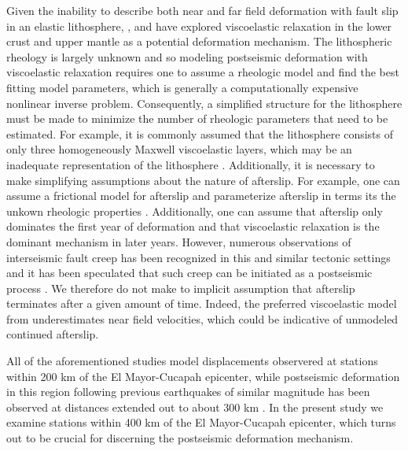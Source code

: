 \documentclass[12pt]{article}
\begin{document}
Given the inability to describe both near and far field deformation with fault slip in an elastic lithosphere, \citet{Pollitz2012}, \citet{Rollins2015} and \citet{Spinler2015} have explored viscoelastic relaxation in the lower crust and upper mantle as a potential deformation mechanism. The lithospheric rheology is largely unknown and so modeling postseismic deformation with viscoelastic relaxation requires one to assume a rheologic model and find the best fitting model parameters, which is generally a computationally expensive nonlinear inverse problem. Consequently, a simplified structure for the lithosphere must be made to minimize the number of rheologic parameters that need to be estimated.  For example, it is commonly assumed that the lithosphere consists of only three homogeneously Maxwell viscoelastic layers, which may be an inadequate representation of the lithosphere \citep[e.g.][]{Hines2013,Riva2009}. Additionally, it is necessary to make simplifying assumptions about the nature of afterslip. For example, one can assume a frictional model for afterslip and parameterize afterslip in terms its the unkown rheologic properties \citep[e.g.][]{Johnson2009,Johnson2004}. Additionally, one can assume that afterslip only dominates the first year of deformation \citep[e.g.][]{Pollitz2012,Spinler2015} and that viscoelastic relaxation is the dominant mechanism in later years. However, numerous observations of interseismic fault creep has been recognized in this and similar tectonic settings and it has been speculated that such creep can be initiated as a postseismic process \citep{Cakir2012,Cetin2014}.  We therefore do not make to implicit assumption that afterslip terminates after a given amount of time.  Indeed, the preferred viscoelastic model from \citet{Pollitz2012} underestimates near field velocities, which could be indicative of unmodeled continued afterslip.

All of the aforementioned studies model displacements observered at stations within 200 km of the El Mayor-Cucapah epicenter, while postseismic deformation in this region following previous earthquakes of similar magnitude has been observed at distances extended out to about 300 km \citep{Freed2007a}. In the present study we examine stations within 400 km of the El Mayor-Cucapah epicenter, which turns out to be crucial for discerning the postseismic deformation mechanism.
\end{document}
